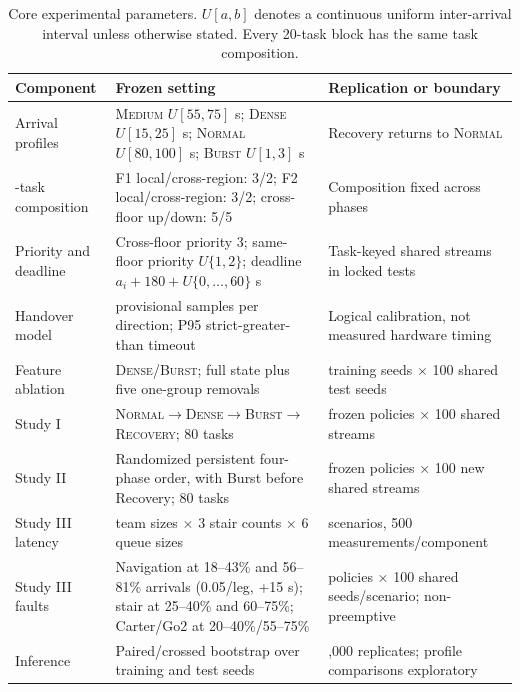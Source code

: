 \documentclass[journal]{IEEEtran}
\begin{document}
\begin{table}[!t]
\centering
\caption{Core experimental parameters. $U[a,b]$ denotes a continuous uniform inter-arrival interval unless otherwise stated. Every 20-task block has the same task composition.}
\label{tab:protocol_parameters}
\footnotesize
\setlength{\tabcolsep}{4.0pt}
\begin{tabular}{>{\raggedright\arraybackslash}p{}>{\raggedright\arraybackslash}p{}>{\raggedright\arraybackslash}p{}}
\toprule
Component & Frozen setting & Replication or boundary \\
\midrule
Arrival profiles & \textsc{Medium} $U[55,75]$ s; \textsc{Dense} $U[15,25]$ s; \textsc{Normal} $U[80,100]$ s; \textsc{Burst} $U[1,3]$ s & Recovery returns to \textsc{Normal} \\
20-task composition & F1 local/cross-region: 3/2; F2 local/cross-region: 3/2; cross-floor up/down: 5/5 & Composition fixed across phases \\
Priority and deadline & Cross-floor priority 3; same-floor priority $U\{1,2\}$; deadline $a_i+180+U\{0,\ldots,60\}$ s & Task-keyed shared streams in locked tests \\
Handover model & 500 provisional samples per direction; P95 strict-greater-than timeout & Logical calibration, not measured hardware timing \\
Feature ablation & \textsc{Dense}/\textsc{Burst}; full state plus five one-group removals & 10 training seeds $\times$ 100 shared test seeds \\
Study I & \textsc{Normal}$\rightarrow$\textsc{Dense}$\rightarrow$\textsc{Burst}$\rightarrow$\textsc{Recovery}; 80 tasks & 30 frozen policies $\times$ 100 shared streams \\
Study II & Randomized persistent four-phase order, with Burst before Recovery; 80 tasks & 10 frozen policies $\times$ 100 new shared streams \\
Study III latency & 3 team sizes $\times$ 3 stair counts $\times$ 6 queue sizes & 54 scenarios, 500 measurements/component \\
Study III faults & Navigation at 18--43\% and 56--81\% arrivals (0.05/leg, +15 s); stair at 25--40\% and 60--75\%; Carter/Go2 at 20--40\%/55--75\% & 10 policies $\times$ 100 shared seeds/scenario; non-preemptive \\
Inference & Paired/crossed bootstrap over training and test seeds & 10,000 replicates; profile comparisons exploratory \\
\bottomrule
\end{tabular}
\end{table}
\end{document}
